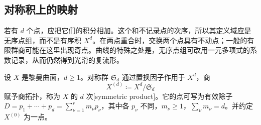\subsection{对称积上的映射}
\label{g4:subsec:0402:03}

若有 \(d\) 个点，应把它们的积分相加。这个和不记录点的次序，所以其定义域应是无序点组，而不是有序积 \(X^d\)。在两点重合时，交换两个点具有不动点；一般的有限群商可能在这里出现奇点。曲线的特殊之处是，无序点组可改用一元多项式的系数记录，从而仍然得到光滑的复流形。

\begin{definition}
	\label{g4:def:0402:symmetric-product}
	设 \(X\) 是黎曼曲面，\(d\ge1\)。对称群 \(\mathfrak S_d\) 通过置换因子作用于 \(X^d\)，商
	\[
		X^{(d)}\coloneqq X^d/\mathfrak S_d
	\]
	赋予商拓扑，称为 \(X\) 的 \(d\) 次[symmetric product]。它的点可写为有效除子
	\(D=p_1+\cdots+p_d=\sum_{\nu=1}^r m_\nu p_\nu\)，其中各 \(p_\nu\) 不同，\(m_\nu\ge1\)，\(\sum_\nu m_\nu=d\)。并约定 \(X^{(0)}\) 为一点。
\end{definition}

